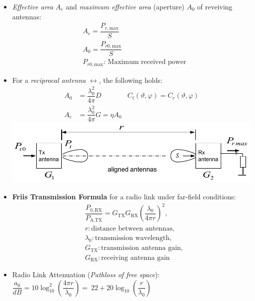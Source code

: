     \begin{itemize}
    \item \textit{Effective area} $A_e$ and \textit{maximum effective area} (aperture) $A_0$ of reveiving antennas:\\
        \begin{align*}
            &A_e = \dfrac{P_{r,\mathrm{max}}}{S}\\
            &A_0 = \dfrac{P_{r0,\mathrm{max}}}{S}\\
            &P_{r0,\mathrm{max}}\text{: Maximum received power}
        \end{align*}
    \item For a \textit{reciprocal antenna} $\leftrightarrow$, the following holds:
        \begin{align*}
            A_0 &= \dfrac{\lambda_0^2}{4\pi} D &C_t(\vartheta, \varphi) = C_r(\vartheta, \varphi)\\
            A_e &= \dfrac{\lambda_0^2}{4\pi} G = \eta A_0&
        \end{align*}
    \includegraphics[width=.3\paperheight]{content/aawp/pictures/friis_transmission.png}
    \item \textbf{Friis Transmission Formula} for a radio link under far-field conditions:
        \begin{align}
            &\dfrac{P_{0,\text{RX}}}{P_{\text{A,TX}}} = G_{\text{TX}} G_{\text{RX}} \left(\dfrac{\lambda_0}{4\pi r} \right)^2,\label{eq:friis}\\
            &r: \text{distance between antennas},\nonumber\\
            &\lambda_0: \text{transmission wavelength},\nonumber\\
            &G_{\text{TX}}: \text{transmission antenna gain},\nonumber\\
            &G_{\text{RX}}: \text{receiving antenna gain}\nonumber
        \end{align}
    \item Radio Link Attenuation (\textit{Pathloss of free space}):\\
        \(\dfrac{a_0}{\si{dB}} = 10 \log_{10}^2\left(\dfrac{4 \pi r}{\lambda_0}\right) =\
        22 + 20 \log_{10}\left(\dfrac{r}{\lambda_0}\right)\)
\end{itemize}

